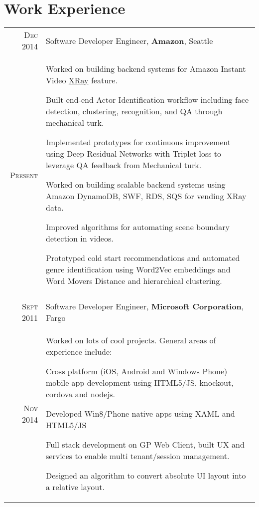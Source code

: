 \documentclass[a4paper,11pt]{article}
\begin{document}
\section{Work Experience}
\begin{longtable}{r|p{12.5cm}}
 \textsc{Dec 2014} & Software Developer Engineer, \normalsize   \textbf{Amazon}, Seattle \\
 \textsc{Present} & \footnotesize{\begin{minipage}[t]{12.5cm} Worked on building backend systems for Amazon Instant Video \href{http://www.wired.com/2015/04/amazon-xray-fire-tv/}{XRay} feature.
 \begin{compactitem}
    \item Built end-end Actor Identification workflow including face detection, clustering, recognition, and QA through mechanical turk.
    \item Implemented prototypes for continuous improvement using Deep Residual Networks with Triplet loss to leverage QA feedback from Mechanical turk.
    \item Worked on building scalable backend systems using Amazon DynamoDB, SWF, RDS, SQS for vending XRay data.
    \item Improved algorithms for automating scene boundary detection in videos.
    \item Prototyped cold start recommendations and automated genre identification using Word2Vec embeddings and Word Movers Distance and hierarchical clustering.
\end{compactitem}
 \end{minipage}}
 \\
 \multicolumn{2}{c}{}
 \\
 \textsc{Sept 2011} & Software Developer Engineer, \normalsize \textbf{Microsoft Corporation}, Fargo \\
 \textsc{Nov 2014} & \footnotesize{\begin{minipage}[t]{12.5cm} Worked on lots of cool projects. General areas of experience include:
 \begin{compactitem}
    \item Cross platform (iOS, Android and Windows Phone) mobile app development using HTML5/JS, knockout, cordova and nodejs.
    \item Developed Win8/Phone native apps using XAML and HTML5/JS
    \item Full stack development on GP Web Client, built UX and services to enable multi tenant/session management.
    \item Designed an algorithm to convert absolute UI layout into a relative layout.

\end{compactitem}
\end{minipage}}
\end{longtable}
\end{document}
